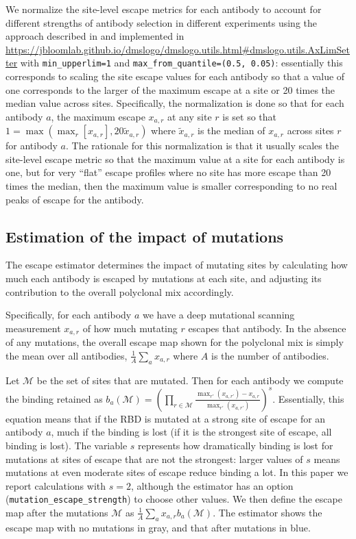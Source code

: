 \documentclass[9pt,twocolumn,twoside]{gsajnl_modified}
\begin{document}
{We normalize the site-level escape metrics for each antibody to account for different strengths of antibody selection in different experiments using the approach described in \citet{greaney2021comprehensive} and implemented in \url{https://jbloomlab.github.io/dmslogo/dmslogo.utils.html#dmslogo.utils.AxLimSetter} with \texttt{min\_upperlim=1} and \texttt{max\_from\_quantile=(0.5, 0.05)}: essentially this corresponds to scaling the site escape values for each antibody so that a value of one corresponds to the larger of the maximum escape at a site or 20 times the median value across sites.
Specifically, the normalization is done so that for each antibody $a$, the maximum escape $x_{a,r}$ at any site $r$ is set so that $1 = \max\left(\max_r \left[x_{a,r}\right], 20\tilde{x}_{a,r} \right)$ where $\tilde{x}_{a,r}$ is the median of $x_{a,r}$ across sites $r$ for antibody $a$.
The rationale for this normalization is that it usually scales the site-level escape metric so that the maximum value at a site for each antibody is one, but for very ``flat'' escape profiles where no site has more escape than 20 times the median, then the maximum value is smaller corresponding to no real peaks of escape for the antibody.


\subsection{Estimation of the impact of mutations}
The escape estimator determines the impact of mutating sites by calculating how much each antibody is escaped by mutations at each site, and adjusting its contribution to the overall polyclonal mix accordingly.

Specifically, for each antibody $a$ we have a deep mutational scanning measurement $x_{a,r}$ of how much mutating $r$ escapes that antibody.
In the absence of any mutations, the overall escape map shown for the polyclonal mix is simply the mean over all antibodies, $\frac{1}{A}\sum_a x_{a,r}$ where $A$ is the number of antibodies.

Let $\mathcal{M}$ be the set of sites that are mutated.
Then for each antibody we compute the binding retained as $b_a\left(\mathcal{M}\right) = \left(\prod\limits_{r \in \mathcal{M}} \frac{\max_{r'}\left(x_{a,r'}\right) - x_{a,r}}{\max_{r'}\left(x_{a,r'}\right)}\right)^s$. 
Essentially, this equation means that if the RBD is mutated at a strong site of escape for an antibody $a$, much if the binding is lost (if it is the strongest site of escape, all binding is lost).
The variable $s$ represents how dramatically binding is lost for mutations at sites of escape that are not the strongest: larger values of $s$ means mutations at even moderate sites of escape reduce binding a lot.
In this paper we report calculations with $s = 2$, although the estimator has an option (\texttt{mutation\_escape\_strength}) to choose other values.
We then define the escape map after the mutations $\mathcal{M}$ as $\frac{1}{A}\sum_a x_{a,r} b_a\left(\mathcal{M}\right)$.
The estimator shows the escape map with no mutations in gray, and that after mutations in blue.

}
\end{document}
